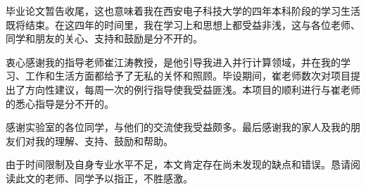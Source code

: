 \begin{thanks}
毕业论文暂告收尾，这也意味着我在西安电子科技大学的四年本科阶段的学习生活既将结束。在这四年的时间里，我在学习上和思想上都受益非浅，这与各位老师、同学和朋友的关心、支持和鼓励是分不开的。

衷心感谢我的指导老师崔江涛教授，是他引导我进入并行计算领域，并在我的学习、工作和生活方面都给予了无私的关怀和照顾。毕设期间，崔老师数次对项目提出了方向性建议，每周一次的例行指导使我受益匪浅。本项目的顺利进行与崔老师的悉心指导是分不开的。

感谢实验室的各位同学，与他们的交流使我受益颇多。最后感谢我的家人及我的朋友们对我的理解、支持、鼓励和帮助。

由于时间限制及自身专业水平不足，本文肯定存在尚未发现的缺点和错误。恳请阅读此文的老师、同学予以指正，不胜感激。
\end{thanks}
